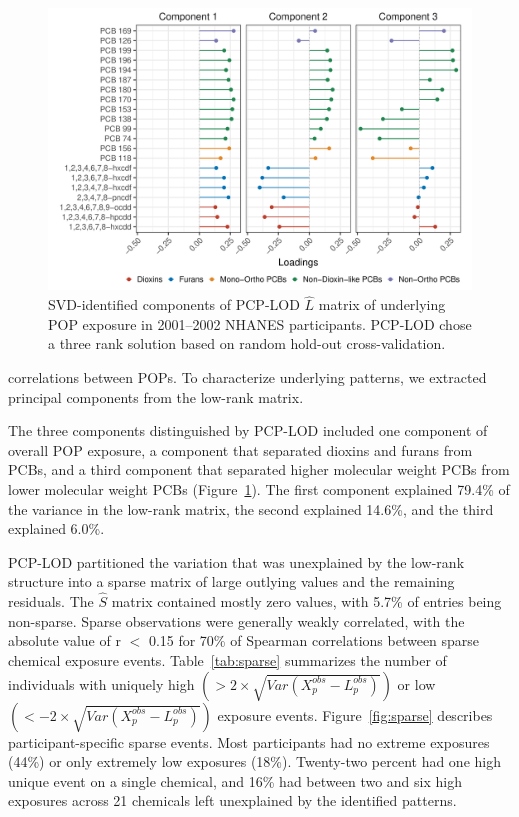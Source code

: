 \begin{landscape}
\begin{figure}
    \centering
\includegraphics[scale=0.55]{figures/loadings.pdf}
   \caption{SVD-identified components of PCP-LOD $\hat{L}$ matrix of underlying POP exposure in 2001--2002 NHANES participants. PCP-LOD chose a three rank solution based on random hold-out cross-validation.}
    \label{fig:nhanes_load}
\end{figure}
\end{landscape}

\noindent correlations between POPs. To characterize underlying patterns, we extracted principal components from the low-rank matrix.

The three components distinguished by PCP-LOD included one component of overall POP exposure, a component that separated dioxins and furans from PCBs, and a third component that separated higher molecular weight PCBs from lower molecular weight PCBs (Figure~\ref{fig:nhanes_load}). The first component explained 79.4\% of the variance in the low-rank matrix, the second explained 14.6\%, and the third explained 6.0\%.

PCP-LOD partitioned the variation that was unexplained by the low-rank structure into a sparse matrix of large outlying values and the remaining residuals. The $\hat{S}$ matrix contained mostly zero values, with 5.7\% of entries being non-sparse. Sparse observations were generally weakly correlated, with the absolute value of r $<$ 0.15 for 70\% of Spearman correlations between sparse chemical exposure events. Table~\ref{tab:sparse} summarizes the number of individuals with uniquely high $\left(> 2 \times \sqrt{Var(X_{p}^{obs} - L_{p}^{obs})}\right)$ or low $\left(< -2 \times \sqrt{Var(X_{p}^{obs} - L_{p}^{obs})}\right)$ exposure events. Figure~\ref{fig:sparse} describes participant-specific sparse events. Most participants had no extreme exposures (44\%) or only extremely low exposures (18\%). Twenty-two percent had one high unique event on a single chemical, and 16\% had between two and six high exposures across 21 chemicals left unexplained by the identified patterns.
  
